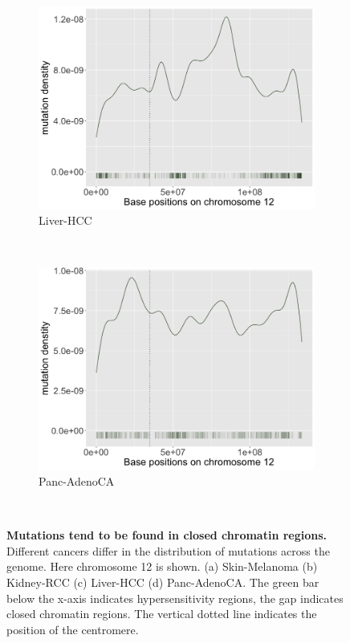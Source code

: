 \begin{figure}
    \begin{subfigure}{.5\textwidth}
    \includegraphics[width=\linewidth,height=0.7\textwidth]{graphics/mutdistribution_Liver-HCC.png}
    \caption{Liver-HCC}
    \label{fig:density_liver}
    \end{subfigure}
    ~
    \begin{subfigure}{.5\textwidth}
    \includegraphics[width=\linewidth,height=0.7\textwidth]{graphics/mutdistribution_Panc-AdenoCA.png}
    \caption{Panc-AdenoCA}
    \label{fig:density_panc_adenoca}
    \end{subfigure} \\
    
    \caption{\textbf{Mutations tend to be found in closed chromatin regions.} Different cancers differ in the distribution of mutations across the genome. Here chromosome 12 is shown. (a) Skin-Melanoma (b) Kidney-RCC (c) Liver-HCC (d) Panc-AdenoCA. The green bar below the x-axis indicates hypersensitivity regions, the gap indicates closed chromatin regions. The vertical dotted line indicates the position of the centromere.}
    \label{fig:mutation_density}
\end{figure}